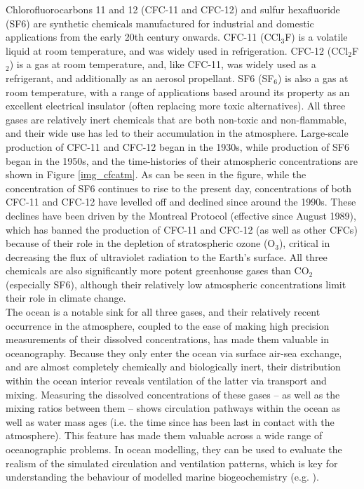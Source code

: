\documentclass[../main/TOP_manual]{subfiles}
\begin{document}
Chlorofluorocarbons 11 and 12 (CFC-11 and CFC-12) and sulfur hexafluoride (SF6) are synthetic chemicals manufactured for industrial and domestic applications from the early 20th century onwards.
CFC-11 (CCl$_{3}$F) is a volatile liquid at room temperature, and was widely used in refrigeration.
CFC-12 (CCl$_{2}$F$_{2}$) is a gas at room temperature, and, like CFC-11, was widely used as a refrigerant,
and additionally as an aerosol propellant.
SF6 (SF$_{6}$) is also a gas at room temperature, with a range of applications based around its property as an excellent electrical insulator (often replacing more toxic alternatives).
All three gases are relatively inert chemicals that are both non-toxic and non-flammable, and their wide use has led to their accumulation in the atmosphere.
Large-scale production of CFC-11 and CFC-12 began in the 1930s, while production of SF6 began in the 1950s, and the time-histories of their atmospheric concentrations are shown in Figure \autoref{img_cfcatm}.
As can be seen in the figure, while the concentration of SF6 continues to rise to the present day, concentrations of both CFC-11 and CFC-12 have levelled off and declined since around the 1990s.
These declines have been driven by the Montreal Protocol (effective since August 1989), which has banned the production of CFC-11 and CFC-12 (as well as other CFCs) because of their role in the depletion of
stratospheric ozone (O$_{3}$), critical in decreasing the flux of ultraviolet radiation to the Earth's surface. All three chemicals are also  significantly more potent greenhouse gases
than CO$_{2}$ (especially SF6), although their relatively low atmospheric concentrations limit their role in climate change. \\

The ocean is a notable sink for all three gases, and their relatively recent occurrence in the atmosphere, coupled to the ease of making high precision measurements of their dissolved concentrations, has made them
valuable in oceanography. %
Because they only enter the ocean via surface air-sea exchange, and are almost completely chemically and biologically inert, their distribution within the ocean interior reveals ventilation of the latter via transport and mixing.
Measuring the dissolved concentrations of these gases -- as well as the mixing ratios between them -- shows circulation pathways within the ocean as well as water mass ages (i.e. the time since has been last in contact with the
atmosphere).
This feature has made them valuable across a wide range of oceanographic problems.
In ocean modelling, they can be used to evaluate the realism of the simulated circulation and
ventilation patterns, which is key for understanding the behaviour of modelled marine biogeochemistry (e.g. \citep{dutay_2002,palmieri_2015}). \\
\end{document}
